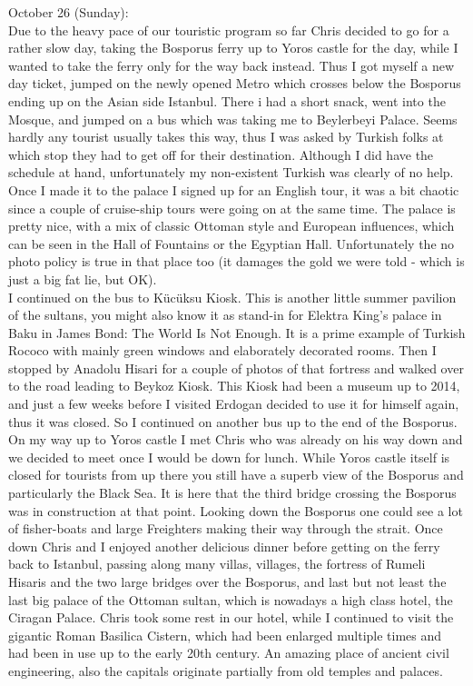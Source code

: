 October 26 (Sunday):\\
Due to the heavy pace of our touristic program so far Chris decided to go for a rather slow day, taking the Bosporus ferry up to Yoros castle for the day, while I wanted to take the ferry only for the way back instead. Thus I got myself a new day ticket, jumped on the newly opened Metro which crosses below the Bosporus ending up on the Asian side Istanbul. There i had a short snack, went into the Mosque, and jumped on a bus which was taking me to Beylerbeyi Palace. Seems hardly any tourist usually takes this way, thus I was asked by Turkish folks at which stop they had to get off for their destination. Although I did have the schedule at hand, unfortunately my non-existent Turkish was clearly of no help. Once I made it to the palace I signed up for an English tour, it was a bit chaotic since a couple of cruise-ship tours were going on at the same time. The palace is pretty nice, with a mix of classic Ottoman style and European influences, which can be seen in the Hall of Fountains or the Egyptian Hall. Unfortunately the no photo policy is true in that place too (it damages the gold we were told - which is just a big fat lie, but OK).\\
I continued on the bus to K\"uc\"uksu Kiosk. This is another little summer pavilion of the sultans, you might also know it as stand-in for Elektra King's palace in Baku in James Bond: The World Is Not Enough. It is a prime example of Turkish Rococo with mainly green windows and elaborately decorated rooms. Then I stopped by Anadolu Hisari for a couple of photos of that fortress and walked over to the road leading to Beykoz Kiosk. This Kiosk had been a museum up to 2014, and just a few weeks before I visited Erdogan decided to use it for himself again, thus it was closed. So I continued on another bus up to the end of the Bosporus.\\
On my way up to Yoros castle I met Chris who was already on his way down and we decided to meet once I would be down for lunch. While Yoros castle itself is closed for tourists from up there you still have a superb view of the Bosporus and particularly the Black Sea. It is here that the third bridge crossing the Bosporus was in construction at that point. Looking down the Bosporus one could see a lot of fisher-boats and large Freighters making their way through the strait. Once down Chris and I enjoyed another delicious dinner before getting on the ferry back to Istanbul, passing along many villas, villages, the fortress of Rumeli Hisaris and the two large bridges over the Bosporus, and last but not least the last big palace of the Ottoman sultan, which is nowadays a high class hotel, the Ciragan Palace. Chris took some rest in our hotel, while I continued to visit the gigantic Roman Basilica Cistern, which had been enlarged multiple times and had been in use up to the early 20th century. An amazing place of ancient civil engineering, also the capitals originate partially from old temples and palaces.\\


